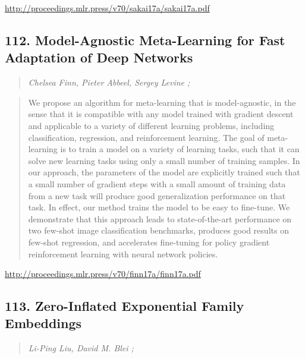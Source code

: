 \documentclass{article}
\begin{document}
\href{http://proceedings.mlr.press/v70/sakai17a/sakai17a.pdf}{http://proceedings.mlr.press/v70/sakai17a/sakai17a.pdf}

\subsection{112. Model-Agnostic Meta-Learning for Fast Adaptation of Deep Networks}

\begin{quote}
\footnotesize{\textit{Chelsea Finn, Pieter Abbeel, Sergey Levine ;}}

\end{quote}

\begin{quote}
    We propose an algorithm for meta-learning that is model-agnostic, in the sense that it is compatible with any model trained with gradient descent and applicable to a variety of different learning problems, including classification, regression, and reinforcement learning. The goal of meta-learning is to train a model on a variety of learning tasks, such that it can solve new learning tasks using only a small number of training samples. In our approach, the parameters of the model are explicitly trained such that a small number of gradient steps with a small amount of training data from a new task will produce good generalization performance on that task. In effect, our method trains the model to be easy to fine-tune. We demonstrate that this approach leads to state-of-the-art performance on two few-shot image classification benchmarks, produces good results on few-shot regression, and accelerates fine-tuning for policy gradient reinforcement learning with neural network policies.  
\end{quote}

\href{http://proceedings.mlr.press/v70/finn17a/finn17a.pdf}{http://proceedings.mlr.press/v70/finn17a/finn17a.pdf}

\subsection{113. Zero-Inflated Exponential Family Embeddings}

\begin{quote}
\footnotesize{\textit{Li-Ping Liu, David M. Blei ;}}

\end{quote}
\end{document}
